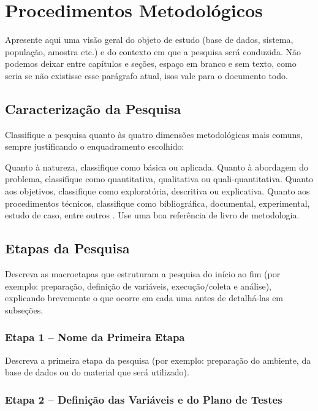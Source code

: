\chapter{Procedimentos Metodológicos}
\label{cap:metodologia2x}

Apresente aqui uma visão geral do objeto de estudo (base de dados, sistema, população, amostra etc.) e do contexto em que a pesquisa será conduzida. Não podemos deixar entre capítulos e seções, espaço em branco e sem texto, como seria se não existisse esse parágrafo atual, isos vale para o documento todo.

\section{Caracterização da Pesquisa}
\label{sec:caracterizacao}

Classifique a pesquisa quanto às quatro dimensões metodológicas mais comuns, sempre justificando o enquadramento escolhido:

Quanto à natureza, classifique como básica ou aplicada. Quanto à abordagem do problema, classifique como quantitativa, qualitativa ou quali-quantitativa. Quanto aos objetivos, classifique como exploratória, descritiva ou explicativa. Quanto aos procedimentos técnicos, classifique como bibliográfica, documental, experimental, estudo de caso, entre outros \cite{marconi2017metodologia}. Use uma boa referência de livro de metodologia.

\section{Etapas da Pesquisa}

Descreva as macroetapas que estruturam a pesquisa do início ao fim (por exemplo: preparação, definição de variáveis, execução/coleta e análise), explicando brevemente o que ocorre em cada uma antes de detalhá-las em subseções.

\subsection{Etapa 1 -- Nome da Primeira Etapa}

Descreva a primeira etapa da pesquisa (por exemplo: preparação do ambiente, da base de dados ou do material que será utilizado).

\subsection{Etapa 2 -- Definição das Variáveis e do Plano de Testes}

